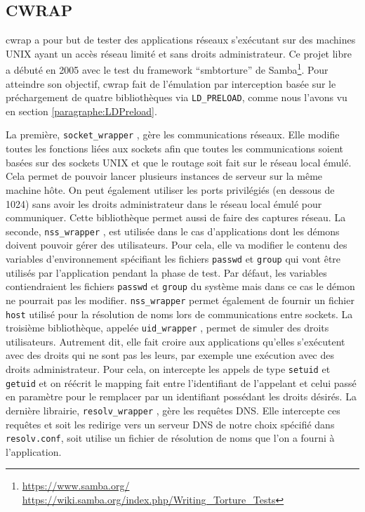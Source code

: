 \subsection{CWRAP}
\label{subsection:cwrap}

cwrap\citep{cwrap, cwrap_bis} a pour but de tester des applications réseaux
s'exécutant sur des machines UNIX ayant un accès réseau limité et sans droits
administrateur. Ce projet libre a débuté en 2005 avec le test du framework
``smbtorture'' de Samba\footnote{\url{https://www.samba.org/}
  \\ \url{https://wiki.samba.org/index.php/Writing\_Torture\_Tests}}. Pour
atteindre son objectif, cwrap fait de l'émulation par interception basée sur le
préchargement de quatre bibliothèques via \texttt{LD\_PRELOAD}, comme nous
l'avons vu en section \ref{paragraphe:LDPreload}.

La première, \texttt{socket\_wrapper} \citep{cwrap}, gère les communications
réseaux. Elle modifie toutes les fonctions liées aux sockets afin que toutes les
communications soient basées sur des sockets UNIX et que le routage soit fait
sur le réseau local émulé. Cela permet de pouvoir lancer plusieurs instances de
serveur sur la même machine hôte. On peut également utiliser les ports
privilégiés (en dessous de 1024) sans avoir les droits administrateur dans le
réseau local émulé pour communiquer. Cette bibliothèque permet aussi de faire
des captures réseau. La seconde, \texttt{nss\_wrapper} \citep{cwrap}, est
utilisée dans le cas d'applications dont les démons doivent pouvoir gérer des
utilisateurs. Pour cela, elle va modifier le contenu des variables
d'environnement spécifiant les fichiers \texttt{passwd} et \texttt{group} qui
vont être utilisés par l'application pendant la phase de test. Par défaut, les
variables contiendraient les fichiers \texttt{passwd} et \texttt{group} du
système mais dans ce cas le démon ne pourrait pas les
modifier. \texttt{nss\_wrapper} permet également de fournir un fichier
\texttt{host} utilisé pour la résolution de noms lors de communications entre
sockets. La troisième bibliothèque, appelée \texttt{uid\_wrapper} \citep{cwrap},
permet de simuler des droits utilisateurs. Autrement dit, elle fait croire aux
applications qu'elles s'exécutent avec des droits qui ne sont pas les leurs, par
exemple une exécution avec des droits administrateur. Pour cela, on intercepte
les appels de type \texttt{setuid} et \texttt{getuid} et on réécrit le mapping
fait entre l'identifiant de l'appelant et celui passé en paramètre pour le
remplacer par un identifiant possédant les droits désirés. La dernière
librairie, \texttt{resolv\_wrapper} \citep{cwrap}, gère les requêtes DNS. Elle
intercepte ces requêtes et soit les redirige vers un serveur DNS de notre choix
spécifié dans \texttt{resolv.conf}, soit utilise un fichier de résolution de
noms que l'on a fourni à l'application.

